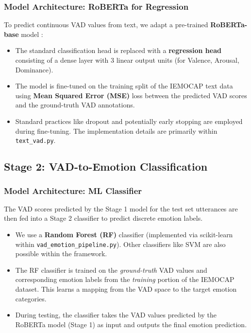 \documentclass[conference]{IEEEtran}
\begin{document}
\subsubsection{Model Architecture: RoBERTa for Regression}
To predict continuous VAD values from text, we adapt a pre-trained \textbf{RoBERTa-base} model \cite{liu2019roberta}:
\begin{itemize}
    \item The standard classification head is replaced with a \textbf{regression head} consisting of a dense layer with 3 linear output units (for Valence, Arousal, Dominance).
    \item The model is fine-tuned on the training split of the IEMOCAP text data using \textbf{Mean Squared Error (MSE)} loss between the predicted VAD scores and the ground-truth VAD annotations.
    \item Standard practices like dropout and potentially early stopping are employed during fine-tuning. The implementation details are primarily within \texttt{text\_vad.py}.
\end{itemize}

\subsection{Stage 2: VAD-to-Emotion Classification}
\subsubsection{Model Architecture: ML Classifier}
The VAD scores predicted by the Stage 1 model for the test set utterances are then fed into a Stage 2 classifier to predict discrete emotion labels.
\begin{itemize}
    \item We use a \textbf{Random Forest (RF)} classifier (implemented via scikit-learn within \texttt{vad\_emotion\_pipeline.py}). Other classifiers like SVM are also possible within the framework.
    \item The RF classifier is trained on the \textit{ground-truth} VAD values and corresponding emotion labels from the \textit{training} portion of the IEMOCAP dataset. This learns a mapping from the VAD space to the target emotion categories.
    \item During testing, the classifier takes the VAD values predicted by the RoBERTa model (Stage 1) as input and outputs the final emotion prediction.
\end{itemize}
\end{document}
